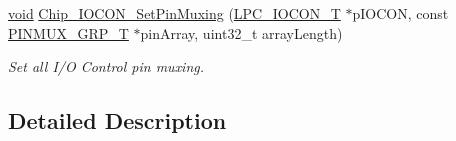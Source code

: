 \begin{DoxyCompactItemize}
\hyperlink{Paradigm_2Tern__EE_2small_2portmacro_8h_a14d32f8130d3c0b212cfc751730b5b49}{void} \hyperlink{group__IOCON__17XX__40XX_gad97c96e401016cf296e6d20454f1c522}{Chip\-\_\-\-I\-O\-C\-O\-N\-\_\-\-Set\-Pin\-Muxing} (\hyperlink{structLPC__IOCON__T}{L\-P\-C\-\_\-\-I\-O\-C\-O\-N\-\_\-\-T} $\ast$p\-I\-O\-C\-O\-N, const \hyperlink{structPINMUX__GRP__T}{P\-I\-N\-M\-U\-X\-\_\-\-G\-R\-P\-\_\-\-T} $\ast$pin\-Array, uint32\-\_\-t array\-Length)
\begin{DoxyCompactList}\small\item\em Set all I/\-O Control pin muxing. \end{DoxyCompactList}\end{DoxyCompactItemize}


\subsection{Detailed Description}


